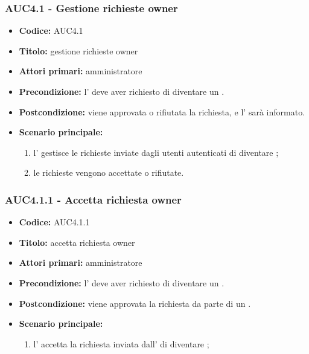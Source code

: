 \documentclass[casi-duso]{subfiles}
\begin{document}
\subsubsection{AUC4.1 - Gestione richieste owner}%
\label{subsub:AUC4.1}
\begin{itemize}
  \item \textbf{Codice:} AUC4.1
  \item \textbf{Titolo:} gestione richieste owner
  \item \textbf{Attori primari:} amministratore
  \item \textbf{Precondizione:} l' deve aver richiesto di diventare un .
  \item \textbf{Postcondizione:} viene approvata o rifiutata la richiesta, e l' sarà informato.
  \item \textbf{Scenario principale:} 
  \begin{enumerate}
    \item l' gestisce le richieste inviate dagli utenti autenticati di diventare ;
    \item le richieste vengono accettate o rifiutate.
  \end{enumerate}
\end{itemize}

\subsubsection{AUC4.1.1 - Accetta richiesta owner}%
\label{subsub:AUC4.1.1}
\begin{itemize}
  \item \textbf{Codice:} AUC4.1.1
  \item \textbf{Titolo:} accetta richiesta owner
  \item \textbf{Attori primari:} amministratore
  \item \textbf{Precondizione:} l' deve aver richiesto di diventare un .
  \item \textbf{Postcondizione:} viene approvata la richiesta da parte di un .
  \item \textbf{Scenario principale:}
  \begin{enumerate}
    \item l' accetta la richiesta inviata dall' di diventare ;
  \end{enumerate}
\end{itemize}
\end{document}

